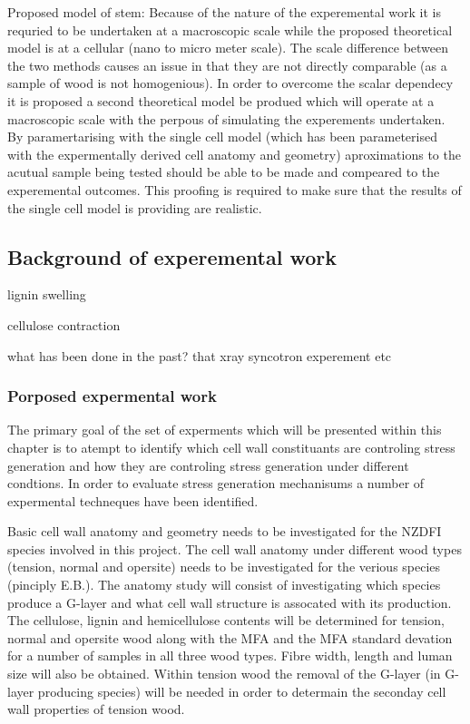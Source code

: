\documentclass{article}
\begin{document}
Proposed model of stem:
Because of the nature of the experemental work it is requried to be undertaken
at a macroscopic scale while the proposed theoretical model is at a cellular
(nano to micro meter scale). The scale difference between the two methods causes
an issue in that they are not directly comparable (as a sample of wood is not
homogenious). In order to overcome the scalar dependecy it is proposed a second
theoretical model be produed which will operate at a macroscopic scale with the
perpous of simulating the experements undertaken. By paramertarising with the
single cell model (which has been parameterised with the expermentally derived
cell anatomy and geometry) aproximations to the acutual sample being tested
should be able to be made and compeared to the experemental outcomes. This
proofing is required to make sure that the results of the single cell model is
providing are realistic.

\subsection{Background of experemental work}

lignin swelling

cellulose contraction

what has been done in the past?
that xray syncotron experement etc

\subsubsection{Porposed expermental work}

The primary goal of the set of experments which will be presented within this
chapter is to atempt to identify which cell wall constituants are controling
stress generation and how they are controling stress generation under different
condtions. In order to evaluate stress generation mechanisums a number of
expermental techneques have been identified.

Basic cell wall anatomy and geometry needs to be investigated for the NZDFI
species involved in this project. The cell wall anatomy under different wood
types (tension, normal and opersite) needs to be investigated for the verious
species (pinciply E.B.). The anatomy study will consist of investigating which
species produce a G-layer and what cell wall structure is assocated with its
production. The cellulose, lignin and hemicellulose contents will be determined
for tension, normal and opersite wood along with the MFA and the MFA standard
devation for a number of samples in all three wood types. Fibre width, length
and luman size will also be obtained. Within tension wood the removal of the
G-layer (in G-layer producing species) will be needed in order to determain the
seconday cell wall properties of tension wood.
\end{document}
